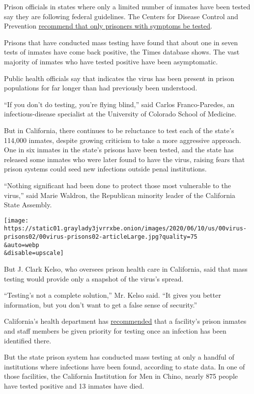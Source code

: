 Prison officials in states where only a limited number of inmates have
been tested say they are following federal guidelines. The Centers for
Disease Control and Prevention
\href{https://www.cdc.gov/coronavirus/2019-nCoV/hcp/clinical-criteria.html}{recommend
that only prisoners with symptoms be tested}.

Prisons that have conducted mass testing have found that about one in
seven tests of inmates have come back positive, the Times database
shows. The vast majority of inmates who have tested positive have been
asymptomatic.

Public health officials say that indicates the virus has been present in
prison populations for far longer than had previously been understood.

``If you don't do testing, you're flying blind,'' said Carlos
Franco-Paredes, an infectious-disease specialist at the University of
Colorado School of Medicine.

But in California, there continues to be reluctance to test each of the
state's 114,000 inmates, despite growing criticism to take a more
aggressive approach. One in six inmates in the state's prisons have been
tested, and the state has released some inmates who were later found to
have the virus, raising fears that prison systems could seed new
infections outside penal institutions.

``Nothing significant had been done to protect those most vulnerable to
the virus,'' said Marie Waldron, the Republican minority leader of the
California State Assembly.

\texttt{[image: https://static01.graylady3jvrrxbe.onion/images/2020/06/10/us/00virus-prisons02/00virus-prisons02-articleLarge.jpg?quality=75\\\&auto=webp\\\&disable=upscale]}

But J. Clark Kelso, who oversees prison health care in California, said
that mass testing would provide only a snapshot of the virus's spread.

``Testing's not a complete solution,'' Mr. Kelso said. ``It gives you
better information, but you don't want to get a false sense of
security.''

California's health department has
\href{https://www.cdph.ca.gov/Programs/CID/DCDC/Pages/COVID-19/Expanding-Access-to-Testing-Updated-Guidance-on-Prioritization-for-COVID-19-Testing.aspx}{recommended}
that a facility's prison inmates and staff members be given priority for
testing once an infection has been identified there.

But the state prison system has conducted mass testing at only a handful
of institutions where infections have been found, according to state
data. In one of those facilities, the California Institution for Men in
Chino, nearly 875 people have tested positive and 13 inmates have died.


